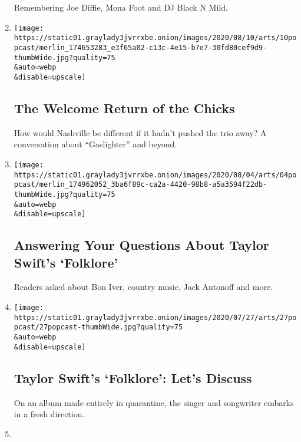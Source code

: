 \begin{enumerate}
  Remembering Joe Diffie, Mona Foot and DJ Black N Mild.
\item
  \href{/2020/08/10/arts/music/popcast-the-chicks-gaslighter.html}{}

  \texttt{[image: https://static01.graylady3jvrrxbe.onion/images/2020/08/10/arts/10popcast/merlin\_174653283\_e3f65a02-c13c-4e15-b7e7-30fd80cef9d9-thumbWide.jpg?quality=75\\\&auto=webp\\\&disable=upscale]}

  \hypertarget{the-welcome-return-of-the-chicks}{%
  \subsection{The Welcome Return of the
  Chicks}\label{the-welcome-return-of-the-chicks}}

  How would Nashville be different if it hadn't pushed the trio away? A
  conversation about ``Gaslighter'' and beyond.
\item
  \href{/2020/08/04/arts/music/taylor-swift-folklore-questions.html}{}

  \texttt{[image: https://static01.graylady3jvrrxbe.onion/images/2020/08/04/arts/04popcast/merlin\_174962052\_3ba6f89c-ca2a-4420-98b8-a5a3594f22db-thumbWide.jpg?quality=75\\\&auto=webp\\\&disable=upscale]}

  \hypertarget{answering-your-questions-about-taylor-swifts-folklore}{%
  \subsection{Answering Your Questions About Taylor Swift's
  `Folklore'}\label{answering-your-questions-about-taylor-swifts-folklore}}

  Readers asked about Bon Iver, country music, Jack Antonoff and more.
\item
  \href{/2020/07/27/arts/music/popcast-taylor-swift-folklore.html}{}

  \texttt{[image: https://static01.graylady3jvrrxbe.onion/images/2020/07/27/arts/27popcast/27popcast-thumbWide.jpg?quality=75\\\&auto=webp\\\&disable=upscale]}

  \hypertarget{taylor-swifts-folklore-lets-discuss}{%
  \subsection{Taylor Swift's `Folklore': Let's
  Discuss}\label{taylor-swifts-folklore-lets-discuss}}

  On an album made entirely in quarantine, the singer and songwriter
  embarks in a fresh direction.
\item
  \href{/2020/07/20/arts/music/popcast-ennio-morricone.html}{}


\end{enumerate}
